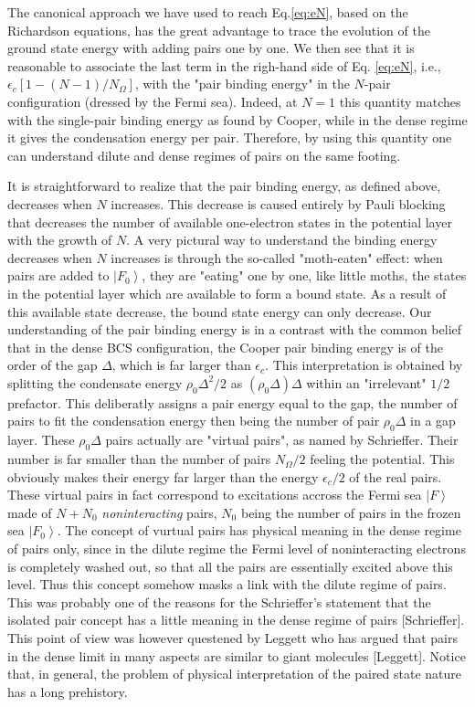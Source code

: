 \documentclass[aps,prb,superscriptaddress,twocolumn]{revtex4}
\begin{document}
The canonical approach we have used to reach Eq.\eqref{eq:eN}, based on the
Richardson equations, has the great advantage to trace the evolution of the
ground state energy with adding pairs one by one. We then see that it is
reasonable to associate the last term in the righ-hand side of Eq.%
\eqref{eq:eN}, i.e., $\epsilon _{c}\left[ 1-\left( N-1\right) /N_{\Omega }%
\right] $, with the "pair binding energy" in the $N$-pair configuration
(dressed by the Fermi sea). Indeed, at $N=1$ this quantity matches with the
single-pair binding energy as found by Cooper, while in the dense regime it
gives the condensation energy per pair. Therefore, by using this quantity
one can understand dilute and dense regimes of pairs on the same footing.

It is straightforward to realize that the pair binding energy, as defined
above, decreases when $N$ increases. This decrease is caused entirely by
Pauli blocking that decreases the number of available one-electron states in
the potential layer with the growth of $N$. A very pictural way to
understand the binding energy decreases when $N$ increases is through the
so-called "moth-eaten" effect: when pairs are added to $\left\vert
F_{0}\right\rangle $, they are "eating" one by one, like little moths, the
states in the potential layer which are available to form a bound state. As
a result of this available state decrease, the bound state energy can only
decrease. Our understanding of the pair binding energy is in a contrast with
the common belief that in the dense BCS configuration, the Cooper pair
binding energy is of the order of the gap $\Delta $, which is far larger
than $\epsilon _{c}$. This interpretation is obtained by splitting the
condensate energy $\rho _{0}\Delta ^{2}/2$ as $(\rho _{0}\Delta )\Delta $
within an "irrelevant" $1/2$ prefactor. This deliberatly assigns a pair
energy equal to the gap, the number of pairs to fit the condensation energy
then being the number of pair $\rho _{0}\Delta $ in a gap layer. These $\rho
_{0}\Delta $ pairs actually are "virtual pairs", as named by Schrieffer.
Their number is far smaller than the number of pairs $N_{\Omega }/2$ feeling
the potential. This obviously makes their energy far larger than the energy $%
\epsilon _{c}/2$ of the real pairs. These virtual pairs in fact correspond
to excitations accross the Fermi sea $\left\vert F\right\rangle $ made of $%
N+N_{0}$ \textit{noninteracting} pairs, $N_{0}$ being the number of pairs in
the frozen sea $\left\vert F_{0}\right\rangle $. The concept of vurtual
pairs has physical meaning in the dense regime of pairs only, since in the
dilute regime the Fermi level of noninteracting electrons is completely
washed out, so that all the pairs are essentially excited above this level.
Thus this concept somehow masks a link with the dilute regime of pairs. This
was probably one of the reasons for the Schrieffer's statement that the
isolated pair concept has a little meaning in the dense regime of pairs
[Schrieffer]. This point of view was however questened by Leggett who has
argued that pairs in the dense limit in many aspects are similar to giant
molecules [Leggett]. Notice that, in general, the problem of physical
interpretation of the paired state nature has a long prehistory.
\end{document}
